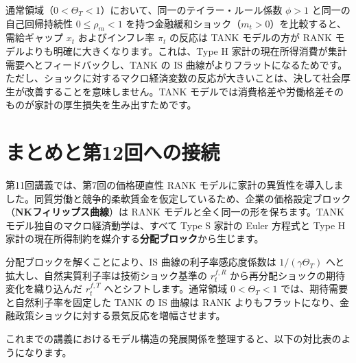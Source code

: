 \documentclass[
  japanese,
  lualatex,
  ja=standard,
  12pt,
  a4paper]{ltjsarticle}
\begin{document}
\begin{tcolorbox}[enhanced jigsaw, arc=.35mm, bottomrule=.15mm, bottomtitle=1mm, breakable, colback=white, colbacktitle=quarto-callout-important-color!10!white, colframe=quarto-callout-important-color-frame, coltitle=black, left=2mm, leftrule=.75mm, opacityback=0, opacitybacktitle=0.6, rightrule=.15mm, title=\textcolor{quarto-callout-important-color}{\faExclamation}\hspace{0.5em}{金融政策ショックへの含意}, titlerule=0mm, toprule=.15mm, toptitle=1mm]

通常領域（\(0<\Theta_T<1\)）において、同一のテイラー・ルール係数
\(\phi>1\) と同一の自己回帰持続性 \(0 \leq \rho_m < 1\)
を持つ金融緩和ショック（\(m_t>0\)）を比較すると、需給ギャップ \(x_t\)
およびインフレ率 \(\pi_t\) の反応は TANK モデルの方が RANK
モデルよりも明確に大きくなります。これは、Type H
家計の現在所得消費が集計需要へとフィードバックし、TANK の IS
曲線がよりフラットになるためです。ただし、ショックに対するマクロ経済変数の反応が大きいことは、決して社会厚生が改善することを意味しません。TANK
モデルでは消費格差や労働格差そのものが家計の厚生損失を生み出すためです。

\end{tcolorbox}

\section{まとめと第12回への接続}\label{ux307eux3068ux3081ux3068ux7b2c12ux56deux3078ux306eux63a5ux7d9a}

第11回講義では、第7回の価格硬直性 RANK
モデルに家計の異質性を導入しました。同質労働と競争的柔軟賃金を仮定しているため、企業の価格設定ブロック（\textbf{NKフィリップス曲線}）は
RANK モデルと全く同一の形を保ちます。TANK
モデル独自のマクロ経済動学は、すべて Type S 家計の Euler 方程式と Type H
家計の現在所得制約を媒介する\textbf{分配ブロック}から生じます。

分配ブロックを解くことにより、IS 曲線の利子率感応度係数は
\(1/(\gamma \Theta_T)\) へと拡大し、自然実質利子率は技術ショック基準の
\(r_t^{f,R}\) から再分配ショックの期待変化を織り込んだ \(r_t^{f,T}\)
へとシフトします。通常領域 \(0<\Theta_T<1\)
では、期待需要と自然利子率を固定した TANK の IS 曲線は RANK
よりもフラットになり、金融政策ショックに対する景気反応を増幅させます。


これまでの講義におけるモデル構造の発展関係を整理すると、以下の対比表のようになります。
\end{document}

